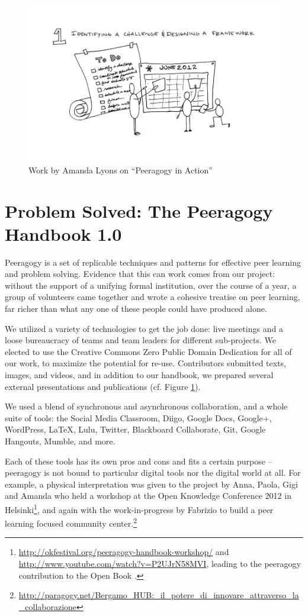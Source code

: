 \documentclass{acm_proc_article-sp}
\begin{document}
\begin{figure}
\begin{center}
\includegraphics[width=.5\textwidth]{OpenBook1.jpg}
\vspace{-.7in}
\end{center}
\caption{Work by Amanda Lyons on ``Peeragogy in Action''
  \cite{PeeragogyinAction} \label{amanda}}
\end{figure}

\section{Problem Solved: The Peeragogy Handbook 1.0}

Peeragogy is a set of replicable techniques and patterns for effective
peer learning and problem solving.  Evidence that this can work comes
from our project: without the support of a unifying formal
institution, over the course of a year, a group of volunteers came
together and wrote a cohesive treatise on peer learning, far richer
than what any one of these people could have produced alone.

We utilized a variety of technologies to get the job done: live
meetings and a loose bureaucracy of teams and team leaders for
different sub-projects.  We elected to use the Creative Commons Zero
Public Domain Dedication for all of our work, to maximize the
potential for re-use.  Contributors submitted texts, images, and
videos, and in addition to our handbook, we prepared several external
presentations and publications (cf. Figure \ref{amanda}).

We used a blend of synchronous and asynchronous collaboration, and a
whole suite of tools: the Social Media Classroom, Diigo, Google Docs,
Google+, WordPress, LaTeX, Lulu, Twitter, Blackboard Collaborate, Git,
Google Hangouts, Mumble, and more.  

Each of these tools has its own pros and cons and fits a certain
purpose -- peeragogy is not bound to particular digital tools nor the
digital world at all.  For example, a physical interpretation was
given to the project by Anna, Paola, Gigi and Amanda who held a
workshop at the Open Knowledge Conference 2012 in Helsinki\footnote{
  \url{http://okfestival.org/peeragogy-handbook-workshop/} and
  \url{http://www.youtube.com/watch?v=P2UJrN58MVI}, leading to the
  peeragogy contribution to the Open Book \cite{PeeragogyinAction}.},
and again with the work-in-progress by Fabrizio to build a peer learning focused community center.\footnote{\url{http://paragogy.net/Bergamo_HUB:_il_potere_di_innovare_attraverso_la_collaborazione}}
\end{document}
